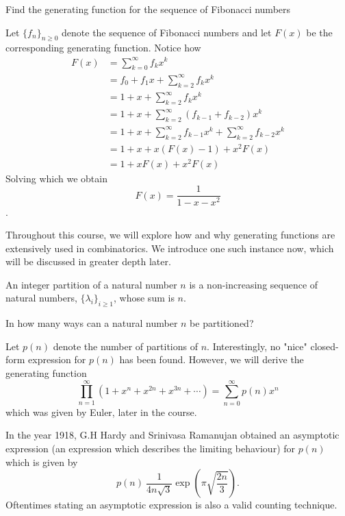 \begin{question}
	Find the generating function for the sequence of Fibonacci numbers 
\end{question}
\begin{solution}
Let $\{f_{n}\}_{n \ge 0}$ denote the sequence of Fibonacci numbers and let $F\left( x \right)$ be the corresponding generating function. Notice how 
\begin{align*}
	F\left( x \right) &= \sum_{k=0}^{\infty} f_{k}x^k \\
	&= f_{0}+f_{1}x+\sum_{k=2}^{\infty}f_{k}x^k \\
	&= 1+x+\sum_{k=2}^{\infty}f_{k}x^k \\
	&= 1+x+\sum_{k=2}^\infty \left( f_{k-1}+f_{k-2} \right) x^k \\
	&= 1+x+\sum_{k=2}^{\infty} f_{k-1}x^k + \sum_{k=2}^{\infty} f_{k-2}x^k \\
	&= 1+x+x\left( F\left( x \right) -1 \right) + x^2F\left( x \right)  \\
	&= 1+xF\left( x \right)+x^2F\left( x \right)
\end{align*}
Solving which we obtain \[
F\left( x \right) = \frac{1}{1-x-x^2}
\].
\end{solution}
Throughout this course, we will explore how and why generating functions are extensively used in combinatorics. We introduce one such instance now, which will be discussed in greater depth later.
\begin{definition}
An integer partition of a natural number $n$ is a non-increasing sequence of natural numbers, $\{\lambda_i\}_{i \ge 1}$, whose sum is $n$.
\label{d:1.5}
\end{definition}
\begin{question}
In how many ways can a natural number $n$ be partitioned?
\end{question}
Let $p(n)$ denote the number of partitions of $n$. Interestingly, no "nice" closed-form expression for $p(n)$ has been found. However, we will derive the generating function \[
	\prod_{n=1}^\infty\left( 1+x^n +x^{2n}+x^{3n}+\cdots\right) =  \sum_{n=0}^{\infty}p\left( n \right) x^n
\] which was given by Euler, later in the course.
\begin{remark}
In the year 1918, G.H Hardy and Srinivasa Ramanujan obtained an asymptotic expression (an expression which describes the limiting behaviour) for $p\left( n \right)$ which is given by \[
p\left( n \right) ~ \frac{1}{4n\sqrt{3}}\exp\left( \pi \sqrt{\frac{2n}{3}}  \right) .\] Oftentimes stating an asymptotic expression is also a valid counting technique.
\end{remark}
